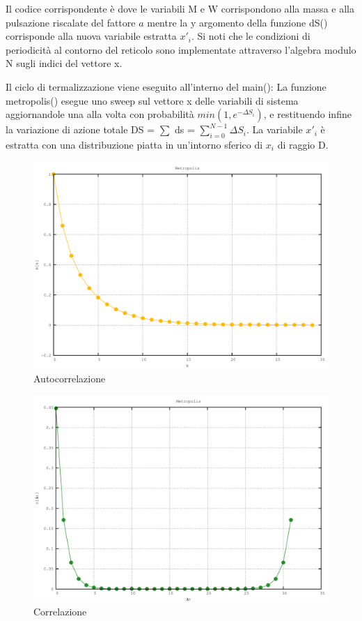 Il codice corrispondente è
dove le variabili {\ttfamily M} e {\ttfamily W} corrispondono alla massa e alla pulsazione riscalate del fattore $a$ mentre la {\ttfamily y} argomento della funzione {\ttfamily dS()} corrisponde alla nuova variabile estratta $x'_{i}$. Si noti che le condizioni di periodicità al contorno del reticolo sono implementate attraverso l'algebra modulo N sugli indici del vettore {\ttfamily x}.

Il ciclo di termalizzazione viene eseguito all'interno del {\ttfamily main()}:
La funzione {\ttfamily metropolis()} esegue uno sweep sul vettore {\ttfamily x} delle variabili di sistema aggiornandole una alla volta con probabilità $min(1,e^{-\Delta S_i})$, e restituendo infine la variazione di azione totale {\ttfamily DS} = {\ttfamily $\sum$ ds} = $\sum^{N-1}_{i=0}\Delta S_i$.
La variabile $x'_i$ è estratta con una distribuzione piatta in un'intorno sferico di $x_i$ di raggio {\ttfamily D}.

\begin{figure}[h]
\centering
\includegraphics[width=\textwidth]{autocorrelation}
\caption{Autocorrelazione}
\label{fig:autocorrelation}
\end{figure}

\begin{figure}[h]
\centering
\includegraphics[width=\textwidth]{correlation}
\caption{Correlazione}
\label{fig:correlation}
\end{figure}

